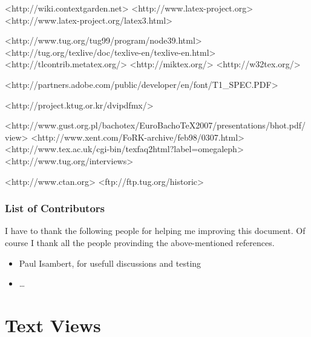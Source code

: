\documentclass{scrartcl}
\begin{document}
	<http://wiki.contextgarden.net>
	<http://www.latex-project.org>
	<http://www.latex-project.org/latex3.html>
	

	<http://www.tug.org/tug99/program/node39.html>
	<http://tug.org/texlive/doc/texlive-en/texlive-en.html>
	<http://tlcontrib.metatex.org/>
	<http://miktex.org/>
	<http://w32tex.org/>

	<http://partners.adobe.com/public/developer/en/font/T1_SPEC.PDF>

	<http://project.ktug.or.kr/dvipdfmx/>
	
	  <http://www.gust.org.pl/bachotex/EuroBachoTeX2007/presentations/bhot.pdf/view>
	<http://www.xent.com/FoRK-archive/feb98/0307.html>
	<http://www.tex.ac.uk/cgi-bin/texfaq2html?label=omegaleph>
	<http://www.tug.org/interviews>
	
	<http://www.ctan.org>
	<ftp://ftp.tug.org/historic>

\clearpage
\section{List of Contributors}
I have to thank the following people for helping me improving this document. Of course I thank all the people provinding the above-mentioned references. 

\begin{itemize}
\item Paul Isambert, for usefull discussions and testing
\item …
\end{itemize}

\clearpage
\part{Text Views}  %
\label{sec:text}
\end{document}
